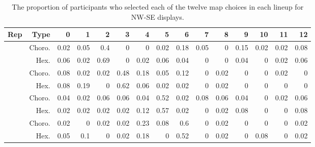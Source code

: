 \documentclass{monashthesis}
\begin{document}
\begin{table}

\caption{\label{tab:choice-nwse}The proportion of participants who selected each of the twelve map choices in each lineup for NW-SE displays.}
\centering
\begin{tabular}[t]{r|r|r|r|r|r|r|r|r|r|r|r|r|r|r}
\hline
Rep & Type & 0 & 1 & 2 & 3 & 4 & 5 & 6 & 7 & 8 & 9 & 10 & 11 & 12\\
\hline
 & Choro. & 0.02 & 0.05 & 0.4 & 0 & 0 & 0.02 & 0.18 & 0.05 & 0 & 0.15 & 0.02 & 0.02 & 0.08\\
\cline{2-15}
\multirow{-2}{*}{\raggedleft\arraybackslash 1} & Hex. & 0.06 & 0.02 & 0.69 & 0 & 0.02 & 0.06 & 0.04 & 0 & 0 & 0.04 & 0 & 0.02 & 0.06\\
\cline{1-15}
 & Choro. & 0.08 & 0.02 & 0.02 & 0.48 & 0.18 & 0.05 & 0.12 & 0 & 0.02 & 0 & 0 & 0.02 & 0\\
\cline{2-15}
\multirow{-2}{*}{\raggedleft\arraybackslash 2} & Hex. & 0.08 & 0.19 & 0 & 0.62 & 0.06 & 0.02 & 0.02 & 0 & 0.02 & 0 & 0 & 0 & 0\\
\cline{1-15}
 & Choro. & 0.04 & 0.02 & 0.06 & 0.06 & 0.04 & 0.52 & 0.02 & 0.08 & 0.06 & 0.04 & 0 & 0.02 & 0.06\\
\cline{2-15}
\multirow{-2}{*}{\raggedleft\arraybackslash 3} & Hex. & 0.02 & 0.02 & 0.02 & 0.02 & 0.12 & 0.57 & 0.02 & 0 & 0.02 & 0.08 & 0 & 0 & 0.08\\
\cline{1-15}
 & Choro. & 0.02 & 0 & 0.02 & 0.02 & 0.23 & 0.08 & 0.6 & 0 & 0.02 & 0 & 0 & 0 & 0.02\\
\cline{2-15}
\multirow{-2}{*}{\raggedleft\arraybackslash 4} & Hex. & 0.05 & 0.1 & 0 & 0.02 & 0.18 & 0 & 0.52 & 0 & 0.02 & 0 & 0.08 & 0 & 0.02\\
\hline
\end{tabular}
\end{table}
\end{document}
